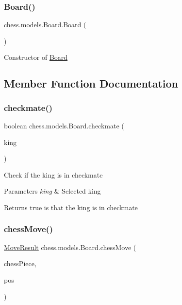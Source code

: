 \subsubsection{\texorpdfstring{Board()}{Board()}}
{\footnotesize\ttfamily chess.\+models.\+Board.\+Board (\begin{DoxyParamCaption}{ }\end{DoxyParamCaption})}

Constructor of \mbox{\hyperlink{classchess_1_1models_1_1_board}{Board}} 

\subsection{Member Function Documentation}
\mbox{\label{classchess_1_1models_1_1_board_a7268e3609f458bc8acd92b43727ca63d}} 
\subsubsection{\texorpdfstring{checkmate()}{checkmate()}}
{\footnotesize\ttfamily boolean chess.\+models.\+Board.\+checkmate (\begin{DoxyParamCaption}\item[{\mbox{\hyperlink{classchess_1_1models_1_1_chess_piece}{Chess\+Piece}}}]{king }\end{DoxyParamCaption})}

Check if the king is in checkmate


\begin{DoxyParams}{Parameters}
{\em king} & Selected king \\
\hline
\end{DoxyParams}
\begin{DoxyReturn}{Returns}
true is that the king is in checkmate 
\end{DoxyReturn}
\mbox{\label{classchess_1_1models_1_1_board_a013a001cb8edfdd61272275d210609fd}} 
\subsubsection{\texorpdfstring{chess\+Move()}{chessMove()}}
{\footnotesize\ttfamily \mbox{\hyperlink{enumchess_1_1models_1_1enums_1_1_move_result}{Move\+Result}} chess.\+models.\+Board.\+chess\+Move (\begin{DoxyParamCaption}\item[{\mbox{\hyperlink{classchess_1_1models_1_1_chess_piece}{Chess\+Piece}}}]{chess\+Piece,  }\item[{\mbox{\hyperlink{classchess_1_1models_1_1_position}{Position}}}]{pos }\end{DoxyParamCaption})}

